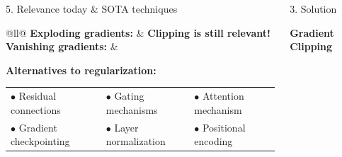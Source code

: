 \documentclass[final]{beamer}
\begin{document}
\begin{frame}[t]
\begin{columns}[t,totalwidth=\textwidth]
\begin{column}{0.3\textwidth}
\begin{block}{5. Relevance today \& SOTA techniques}
            \begin{tabular}{@{}ll@{}}
                \textbf{Exploding gradients:} & \textbf{Clipping is still relevant!} \\
                \textbf{Vanishing gradients:} & 
                    \begin{minipage}[t]{0.8\textwidth} 
                        \textbf{Alternatives to regularization:}\\[0.3em]
                        \begin{tabular}{@{}lll@{}}
                        $\bullet$ Residual connections     & $\bullet$ Gating mechanisms       & $\bullet$ Attention mechanism \\
                        $\bullet$ Gradient checkpointing   & $\bullet$ Layer normalization     & $\bullet$ Positional encoding \\
                        \end{tabular}
                    \end{minipage} \\
                \end{tabular}
                
                \end{block}
    
\end{column}



    \begin{column}{0.35\textwidth}
        \begin{block}{3. Solution }

        \textbf{Gradient Clipping}
        
    

\end{block}
\end{column}
\end{columns}
\end{frame}
\end{document}

